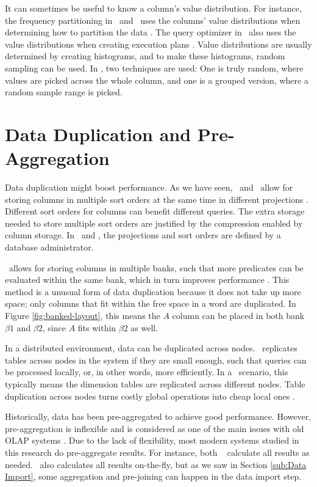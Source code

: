It can sometimes be useful to know a column's value distribution. For instance, the frequency partitioning in \blink~and \ibm~uses the columns' value distributions when determining how to partition the data \cite{Raman2008-gi, Raman2013-em}. The query optimizer in \mssql~also uses the value distributions when creating execution plans \cite{Larson2013-mc}. Value distributions are usually determined by creating histograms, and to make these histograms, random sampling can be used. In \mssql, two techniques are used: One is truly random, where values are picked across the whole column, and one is a grouped version, where a random sample range is picked.

\section{Data Duplication and Pre-Aggregation}
\label{sec:Data Duplication and Pre-Aggregation}
Data duplication might boost performance. As we have seen, \cstore~and \vertica~allow for storing columns in multiple sort orders at the same time in different projections \cite{Lamb2012-kg, Stonebraker2005-qz}. Different sort orders for columns can benefit different queries. The extra storage needed to store multiple sort orders are justified by the compression enabled by column storage. In \cstore~and \vertica, the projections and sort orders are defined by a database administrator. 

\blink~allows for storing columns in multiple banks, such that more predicates can be evaluated within the same bank, which in turn improves performance \cite{Johnson2008-cp}. This method is a unusual form of data duplication because it does not take up more space; only columns that fit within the free space in a word are duplicated. In Figure \ref{fig:banked-layout}, this means the $A$ column can be placed in both bank $\beta 1$ and $\beta 2$, since $A$ fits within $\beta 2$ as well.

In a distributed environment, data can be duplicated across nodes. \exasol~replicates tables across nodes in the system if they are small enough, such that queries can be processed locally, or, in other words, more efficiently. In a \bi~scenario, this typically means the dimension tables are replicated across different nodes. Table duplication across nodes turns costly global operations into cheap local ones \cite{Exasol2014-xh}.

Historically, data has been pre-aggregated to achieve good performance. However, pre-aggregation is inflexible and is considered as one of the main issues with old OLAP systems \cite{Boncz2002-yj}. Due to the lack of flexibility, most modern systems studied in this research do pre-aggregate results. For instance, both \sapnw~\cite{Lemke2010-is} calculate all results as needed. \qlikview~also calculates all results on-the-fly, but as we saw in Section \ref{sub:Data Import}, some aggregation and pre-joining can happen in the data import step.

